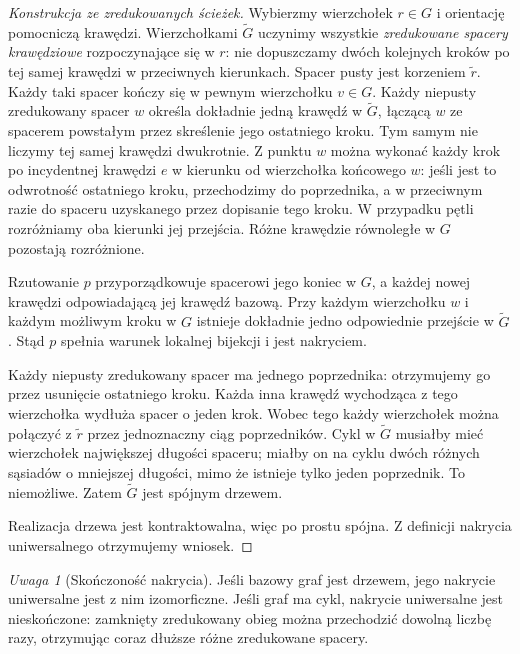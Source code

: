 \documentclass[11pt,a4paper]{report}
\numberwithin{equation}{section}
\theoremstyle{plain}
\theoremstyle{definition}
\theoremstyle{remark}
\newtheorem{uwaga}[twierdzenie]{Uwaga}
\begin{document}
\begin{proof}[Konstrukcja ze zredukowanych ścieżek]
Wybierzmy wierzchołek $r\in G$ i orientację pomocniczą
krawędzi. Wierzchołkami $\widetilde G$ uczynimy wszystkie
\emph{zredukowane spacery krawędziowe} rozpoczynające się w $r$:
nie dopuszczamy dwóch kolejnych kroków po tej samej krawędzi
w przeciwnych kierunkach. Spacer pusty jest korzeniem $\widetilde r$.
Każdy taki spacer kończy się w pewnym wierzchołku $v\in G$.
Każdy niepusty zredukowany spacer $w$ określa dokładnie
jedną krawędź w $\widetilde G$, łączącą $w$ ze spacerem
powstałym przez skreślenie jego ostatniego kroku.
Tym samym nie liczymy tej samej krawędzi dwukrotnie.
Z punktu $w$ można wykonać każdy krok po incydentnej
krawędzi $e$ w kierunku od wierzchołka końcowego $w$:
jeśli jest to odwrotność ostatniego kroku,
przechodzimy do poprzednika, a w przeciwnym razie
do spaceru uzyskanego przez dopisanie tego kroku.
W przypadku pętli rozróżniamy oba kierunki jej przejścia.
Różne krawędzie równoległe w $G$ pozostają rozróżnione.

Rzutowanie $p$ przyporządkowuje spacerowi jego koniec w $G$,
a każdej nowej krawędzi odpowiadającą jej krawędź bazową.
Przy każdym wierzchołku $w$ i każdym możliwym kroku w $G$
istnieje dokładnie jedno odpowiednie przejście w $\widetilde G$.
Stąd $p$ spełnia warunek lokalnej bijekcji i jest nakryciem.

Każdy niepusty zredukowany spacer ma jednego poprzednika:
otrzymujemy go przez usunięcie ostatniego kroku.
Każda inna krawędź wychodząca z tego wierzchołka wydłuża
spacer o jeden krok. Wobec tego każdy wierzchołek można
połączyć z $\widetilde r$ przez jednoznaczny ciąg poprzedników.
Cykl w $\widetilde G$ musiałby mieć wierzchołek największej
długości spaceru; miałby on na cyklu dwóch różnych sąsiadów
o mniejszej długości, mimo że istnieje tylko jeden poprzednik.
To niemożliwe. Zatem $\widetilde G$ jest spójnym drzewem.

Realizacja drzewa jest kontraktowalna, więc po prostu spójna.
Z definicji nakrycia uniwersalnego otrzymujemy wniosek.
\end{proof}

\begin{uwaga}[Skończoność nakrycia]
Jeśli bazowy graf jest drzewem, jego nakrycie uniwersalne
jest z nim izomorficzne. Jeśli graf ma cykl, nakrycie
uniwersalne jest nieskończone: zamknięty zredukowany obieg
można przechodzić dowolną liczbę razy, otrzymując
coraz dłuższe różne zredukowane spacery.
\end{uwaga}
\end{document}
